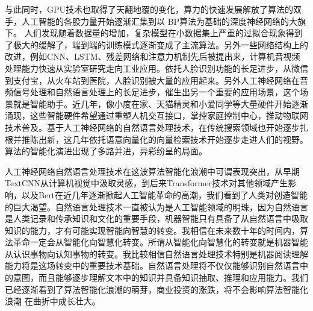 \documentclass[twoside,a4paper,12pt]{book}%
\begin{document}
与此同时，GPU技术也取得了天翻地覆的变化，算力的快速发展解放了算法的双手，人工智能的各股力量开始逐渐汇集到以
BP算法为基础的深度神经网络的大旗下。
人们发现随着数据量的增加，复杂模型在小数据集上严重的过拟合现象得到了极大的缓解了，端到端的训练模式逐渐变成了主流算法。另外一些网络结构上的改进，例如\gls{CNN}、\gls{LSTM}、残差网络和注意力机制先后被提出来，计算机音视频处理能力快速从实验室研究走向工业应用。依托人脸识别功能的长足进步，从微信到支付宝，从火车站到医院，人脸识别被大量的应用起来。另外人工神经网络在音频信号处理和自然语言处理上的长足进步，催生出另一个重要的应用场景，这个场景就是智能助手。近几年，像小度在家、天猫精灵和小爱同学等大量硬件开始逐渐涌现，这些智能硬件希望通过重塑人机交互接口，掌控家庭控制中心，推动物联网技术普及。基于人工神经网络的自然语言处理技术，在传统搜索领域也开始逐步扎根并推陈出新，这几年依托语意向量化的向量检索技术开始逐步走进人们的视野。算法的智能化演进出现了多路并进，异彩纷呈的局面。

人工神经网络自然语言处理技术在这波算法智能化浪潮中可谓表现突出，从早期TextCNN从计算机视觉中汲取灵感，到后来Transformer技术对其他领域产生影响，以及Bert在近几年逐渐掀起人工智能革命的高潮，我们看到了人类对创造智能的巨大渴望。自然语言处理技术一直被认为是人工智能领域的明珠，因为自然语言是人类记录和传承知识和文化的重要手段，机器智能只有具备了从自然语言中吸取知识的能力，才有可能实现智能向智慧的转变。我相信在未来数十年的时间内，算法革命一定会从智能化向智慧化转变。所谓从智能化向智慧化的转变就是机器智能从认识事物向认知事物的转变。我比较相信自然语言处理技术特别是机器阅读理解能力将是这场转变中的重要技术基础。自然语言处理将不仅仅能够识别自然语言中的意图，而且能够逐步理解文本中的知识并具备知识抽取、推理和应用能力。我们已经逐渐看到了算法智能化浪潮的萌芽，商业投资的涨跌，将不会影响算法智能化浪潮
在曲折中成长壮大。
\end{document}
